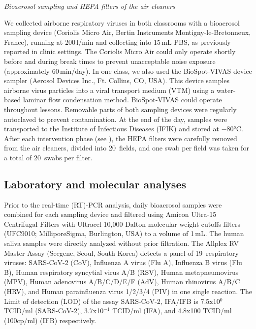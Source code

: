 \documentclass[fleqn,11pt]{wlscirep}
\begin{document}
\noindent \emph{Bioaerosol sampling and HEPA filters of the air cleaners} 

\noindent We collected airborne respiratory viruses in both classrooms with a bioaerosol sampling device (Coriolis Micro Air, Bertin Instruments Montigny-le-Bretonneux, France), running at 200\,l/min and collecting into 15\,mL PBS, as previously reported in clinic settings\cite{Moore2021}. The Coriolis Micro Air could only operate shortly before and during break times to prevent unacceptable noise exposure (approximately 60\,min/day). In one class, we also used the BioSpot-VIVAS device sampler (Aerosol Devices Inc., Ft. Collins, CO, USA). This device samples airborne virus particles into a viral transport medium (VTM) using a water-based laminar flow condensation method\cite{Pan2016JAM,Lednicky2016AST}. BioSpot-VIVAS could operate throughout lessons. Removable parts of both sampling devices were regularly autoclaved to prevent contamination. At the end of the day, samples were transported to the Institute of Infectious Diseases (IFIK) and stored at $-$80°C. After each intervention phase (see ), the HEPA filters were carefully removed from the air cleaners, divided into 20~fields, and one swab per field was taken for a total of 20~swabs per filter.\medskip

\subsection{Laboratory and molecular analyses}\label{sec:mol_analyses}

\noindent Prior to the real-time (RT)-PCR analysis, daily bioaerosol samples were combined for each sampling device and filtered using Amicon Ultra-15 Centrifugal Filters with Ultracel 10,000 Dalton molecular weight cutoffs filters (UFC9010; MilliporeSigma, Burlington, USA) to a volume of 1\,mL. The human saliva samples were directly analyzed without prior filtration. The Allplex RV Master Assay (Seegene, Seoul, South Korea) detects a panel of 19~respiratory viruses: SARS-CoV-2 (CoV), Influenza A virus (Flu A), Influenza B virus (Flu B), Human respiratory syncytial virus A/B (RSV), Human metapneumovirus (MPV), Human adenovirus A/B/C/D/E/F (AdV), Human rhinovirus A/B/C (HRV), and Human parainfluenza virus 1/2/3/4 (PIV) in one single reaction. %
The Limit of detection (LOD) of the assay SARS-CoV-2, IFA/IFB is 7.5x10$^0$ TCID/ml (SARS-CoV-2), 3.7x10$^{-1}$ TCID/ml (IFA), and 4.8x100 TCID/ml (100cp/ml) (IFB) respectively.
\end{document}
